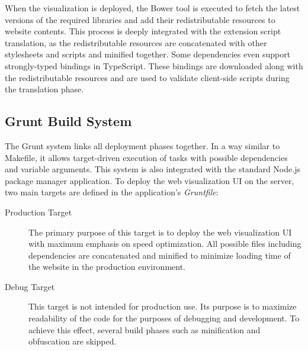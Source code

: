 When the visualization is deployed, the Bower tool is executed to fetch the latest versions of the required libraries and add their redistributable resources to website contents. This process is deeply integrated with the extension script translation, as the redistributable resources are concatenated with other stylesheets and scripts and minified together. Some dependencies even support strongly-typed bindings in TypeScript. These bindings are downloaded along with the redistributable resources and are used to validate client-side scripts during the translation phase.

\subsection{Grunt Build System}
The Grunt system links all deployment phases together. In a way similar to Makefile, it allows target-driven execution of tasks with possible dependencies and variable arguments. This system is also integrated with the standard Node.js package manager application. To deploy the web visualization UI on the server, two main targets are defined in the application's \textit{Gruntfile}:

\begin{description}
	\item[Production Target]
	The primary purpose of this target is to deploy the web visualization UI with maximum emphasis on speed optimization. All possible files including dependencies are concatenated and minified to minimize loading time of the website in the production environment.

	\item[Debug Target]
	This target is not intended for production use. Its purpose is to maximize readability of the code for the purposes of debugging and development. To achieve this effect, several build phases such as minification and obfuscation are skipped.
\end{description}
